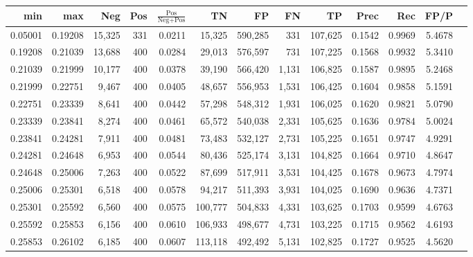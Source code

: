 \begin{tabular}{rrrrrrrrrrrrr}
\toprule
    min &     max &    Neg & Pos & $\frac{\text{Pos}}{\text{Neg}+\text{Pos}}$ &      TN &      FP &      FN &      TP &   Prec &    Rec &   FP/P \\
\midrule
0.05001 & 0.19208 & 15,325 & 331 &                                     0.0211 &  15,325 & 590,285 &     331 & 107,625 & 0.1542 & 0.9969 & 5.4678 \\
0.19208 & 0.21039 & 13,688 & 400 &                                     0.0284 &  29,013 & 576,597 &     731 & 107,225 & 0.1568 & 0.9932 & 5.3410 \\
0.21039 & 0.21999 & 10,177 & 400 &                                     0.0378 &  39,190 & 566,420 &   1,131 & 106,825 & 0.1587 & 0.9895 & 5.2468 \\
0.21999 & 0.22751 &  9,467 & 400 &                                     0.0405 &  48,657 & 556,953 &   1,531 & 106,425 & 0.1604 & 0.9858 & 5.1591 \\
0.22751 & 0.23339 &  8,641 & 400 &                                     0.0442 &  57,298 & 548,312 &   1,931 & 106,025 & 0.1620 & 0.9821 & 5.0790 \\
0.23339 & 0.23841 &  8,274 & 400 &                                     0.0461 &  65,572 & 540,038 &   2,331 & 105,625 & 0.1636 & 0.9784 & 5.0024 \\
0.23841 & 0.24281 &  7,911 & 400 &                                     0.0481 &  73,483 & 532,127 &   2,731 & 105,225 & 0.1651 & 0.9747 & 4.9291 \\
0.24281 & 0.24648 &  6,953 & 400 &                                     0.0544 &  80,436 & 525,174 &   3,131 & 104,825 & 0.1664 & 0.9710 & 4.8647 \\
0.24648 & 0.25006 &  7,263 & 400 &                                     0.0522 &  87,699 & 517,911 &   3,531 & 104,425 & 0.1678 & 0.9673 & 4.7974 \\
0.25006 & 0.25301 &  6,518 & 400 &                                     0.0578 &  94,217 & 511,393 &   3,931 & 104,025 & 0.1690 & 0.9636 & 4.7371 \\
0.25301 & 0.25592 &  6,560 & 400 &                                     0.0575 & 100,777 & 504,833 &   4,331 & 103,625 & 0.1703 & 0.9599 & 4.6763 \\
0.25592 & 0.25853 &  6,156 & 400 &                                     0.0610 & 106,933 & 498,677 &   4,731 & 103,225 & 0.1715 & 0.9562 & 4.6193 \\
0.25853 & 0.26102 &  6,185 & 400 &                                     0.0607 & 113,118 & 492,492 &   5,131 & 102,825 & 0.1727 & 0.9525 & 4.5620 \\

\end{tabular}
